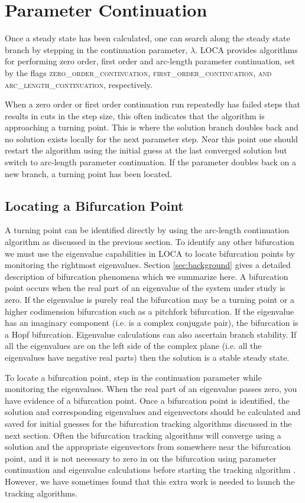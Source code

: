 \section{Parameter Continuation} \label{sec:parametercontinuation}
Once a steady state has been calculated, one can search along the steady state branch by stepping in the continuation parameter, $\lambda$.  LOCA provides algorithms for performing zero order, first order and arc-length parameter continuation, set by the flags \textsc{zero\_order\_continuation, first\_order\_continuation, and arc\_length\_continuation}, respectively. 

When a zero order or first order continuation run repeatedly has failed steps that results in cuts in the step size, this often indicates that the algorithm is approaching a turning point. This is where the solution branch doubles back and no solution exists locally for the next parameter step. Near this point one should restart the algorithm using the initial guess at the last converged solution but switch to arc-length parameter continuation.  If the parameter doubles back on a new branch, a turning point has been located.

\subsection{Locating a Bifurcation Point} \label{sec:locate}
A turning point can be identified directly by using the arc-length continuation algorithm as discussed in the previous section.  To identify any other bifurcation we must use the eigenvalue capabilities in LOCA to locate bifurcation points by monitoring the rightmost eigenvalues.  Section \ref{sec:background} gives a detailed description of bifurcation phenomena which we summarize here.  A bifurcation point occurs when the real part of an eigenvalue of the system under study is zero.  If the eigenvalue is purely real the bifurcation may be a turning point or a higher codimension bifurcation such as a pitchfork bifurcation.  If the eigenvalue has an imaginary component (i.e. is a complex conjugate pair), the bifurcation is a Hopf bifurcation.  Eigenvalue calculations can also ascertain branch stability. If all the eigenvalues are on the left side of the complex plane (i.e. all the eigenvalues have negative real parts) then the solution is a stable steady state.

To locate a bifurcation point, step in the continuation parameter while monitoring the eigenvalues. When the real part of an eigenvalue passes zero, you have evidence of a bifurcation point. Once a bifurcation point is identified, the solution and corresponding eigenvalues and eigenvectors should be calculated and saved for initial guesses for the bifurcation tracking algorithms discussed in the next section. Often the bifurcation tracking algorithms will converge using a solution and the appropriate eigenvectors from somewhere near the bifurcation point, and it is not necessary to zero in on the bifurcation using parameter continuation and eigenvalue calculations before starting the tracking algorithm . However, we have sometimes found that this extra work is needed to launch the tracking algorithms.


